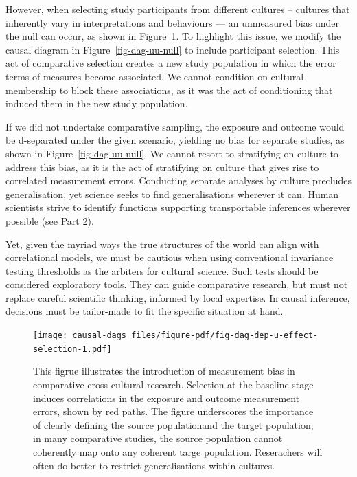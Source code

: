 \documentclass[
  singlecolumn]{article}
\begin{document}
However, when selecting study participants from different cultures --
cultures that inherently vary in interpretations and behaviours --- an
unmeasured bias under the null can occur, as shown in
Figure~\ref{fig-dag-dep-u-effect-selection}. To highlight this issue, we
modify the causal diagram in Figure~\ref{fig-dag-uu-null} to include
participant selection. This act of comparative selection creates a new
study population in which the error terms of measures become associated.
We cannot condition on cultural membership to block these associations,
as it was the act of conditioning that induced them in the new study
population.

If we did not undertake comparative sampling, the exposure and outcome
would be d-separated under the given scenario, yielding no bias for
separate studies, as shown in Figure~\ref{fig-dag-uu-null}. We cannot
resort to stratifying on culture to address this bias, as it is the act
of stratifying on culture that gives rise to correlated measurement
errors. Conducting separate analyses by culture precludes
generalisation, yet science seeks to find generalisations wherever it
can. Human scientists strive to identify functions supporting
transportable inferences wherever possible (see Part 2).

Yet, given the myriad ways the true structures of the world can align
with correlational models, we must be cautious when using conventional
invariance testing thresholds as the arbiters for cultural science. Such
tests should be considered exploratory tools. They can guide comparative
research, but must not replace careful scientific thinking, informed by
local expertise. In causal inference, decisions must be tailor-made to
fit the specific situation at hand.

\begin{figure}

{\centering \texttt{[image: causal-dags\_files/figure-pdf/fig-dag-dep-u-effect-selection-1.pdf]}

}

\caption{\label{fig-dag-dep-u-effect-selection}This figrue illustrates
the introduction of measurement bias in comparative cross-cultural
research. Selection at the baseline stage induces correlations in the
exposure and outcome measurement errors, shown by red paths. The figure
underscores the importance of clearly defining the source populationand
the target population; in many comparative studies, the source
population cannot coherently map onto any coherent targe population.
Reserachers will often do better to restrict generalisations within
cultures.}

\end{figure}
\end{document}
